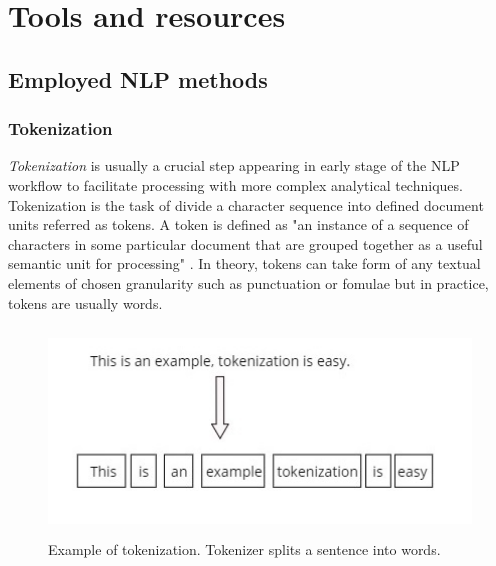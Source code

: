 
\chapter{Tools and resources}
	\label{chapter:empire-strikes-back}%



\section{Employed NLP methods}
\subsection*{Tokenization}
\textit{Tokenization} is usually a crucial step appearing in early stage of the NLP workflow to facilitate processing with more complex analytical techniques. Tokenization is the task of divide a character sequence into defined document units referred as tokens. A token is defined as "an instance of a sequence of characters in some particular document that are grouped together as a useful semantic unit for processing" \cite{Manning:2008:IIR:1394399}. In theory, tokens can take form of any textual elements of chosen granularity such as punctuation or fomulae but in practice, tokens are usually words.\\

\begin{figure}
\centering
\includegraphics[width=\textwidth, clip=true, height = 5.5cm]{img/tokenization_example}
\caption[Tokenization example]{ Example of tokenization. Tokenizer splits a sentence into words.
} 
\label{fig:token_ex1}
\end{figure}

